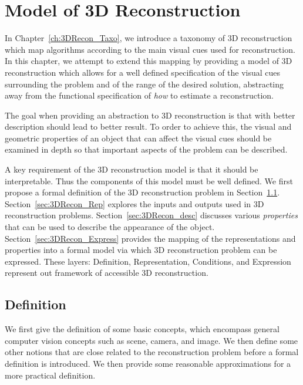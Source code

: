 
\chapter{Model of 3D Reconstruction}
\label{ch:3DRecon_Model}
In Chapter~\ref{ch:3DRecon_Taxo}, we introduce a taxonomy of 3D reconstruction which map algorithms according to the main visual cues used for reconstruction. In this chapter, we attempt to extend this mapping by providing a model of 3D reconstruction which allows for a well defined specification of the visual cues surrounding the problem and of the range of the desired solution, abstracting away from the functional specification of \textit{how} to estimate a reconstruction.

The goal when providing an abstraction to 3D reconstruction is that with better description should lead to better result. To order to achieve this, the visual and geometric properties of an object that can affect the visual cues should be examined in depth so that important aspects of the problem can be described.

A key requirement of the 3D reconstruction model is that it should be interpretable. Thus the components of this model must be well defined. We first propose a formal definition of the 3D reconstruction problem in Section~\ref{sec:3DRecon_Def}. Section~\ref{sec:3DRecon_Rep} explores the inputs and outputs used in 3D reconstruction problems. Section~\ref{sec:3DRecon_desc} discusses various \textit{properties} that can be used to describe the appearance of the object. Section~\ref{sec:3DRecon_Express} provides the mapping of the representations and properties into a formal model via which 3D reconstruction problem can be expressed. These layers: Definition, Representation, Conditions, and Expression represent out framework of accessible 3D reconstruction.

\section{Definition}
\label{sec:3DRecon_Def}
We first give the definition of some basic concepts, which encompass general computer vision concepts such as scene, camera, and image. We then define some other notions that are close related to the reconstruction problem before a formal definition is introduced. We then provide some reasonable approximations for a more practical definition.

